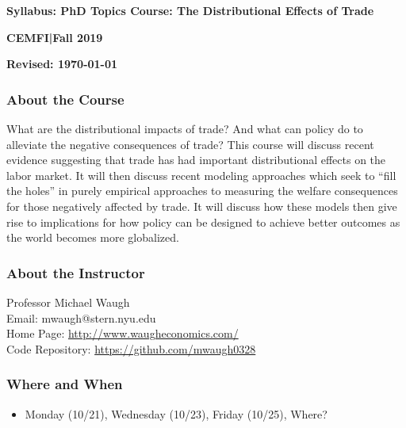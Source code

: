 \documentclass[12pt,pdftex,twoside,letterpaper]{exam}
\begin{document}
\centerline{\large\bf Syllabus: PhD Topics Course: The Distributional Effects of Trade}
\vspace{1mm}
\centerline{\large\bf CEMFI|Fall 2019}
\vspace{3mm}
\centerline{\bf Revised:  \today}







\vspace{-.25cm}

\subsubsection*{About the Course}

What are the distributional impacts of trade? And what can policy do to alleviate the negative consequences of trade?  This course will discuss recent evidence suggesting that trade has had important distributional effects on the labor market. It will then discuss recent modeling approaches which seek to ``fill the holes'' in purely empirical approaches to measuring the welfare consequences for those negatively affected by trade. It will discuss how these models then give rise to implications for how policy can be designed to achieve better outcomes as the world becomes more globalized. 


\subsubsection*{About the Instructor}
Professor Michael Waugh\\
Email: mwaugh@stern.nyu.edu\\
Home Page: \href{http://www.waugheconomics.com/}{http://www.waugheconomics.com/} \\
Code Repository: \href{https://github.com/mwaugh0328}{https://github.com/mwaugh0328} 

\subsubsection*{Where and When}
\begin{itemize}
\item Monday (10/21), Wednesday (10/23), Friday (10/25), Where?
\end{itemize}
\end{document}
